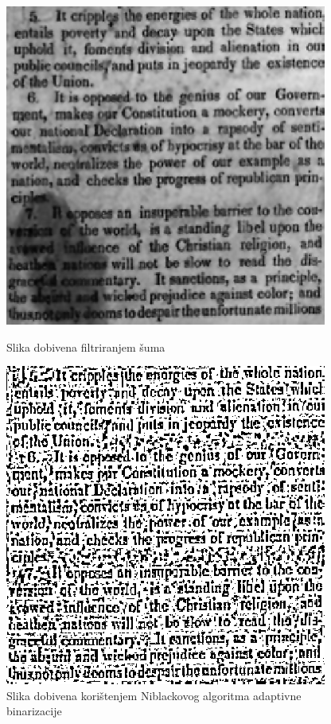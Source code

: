 \documentclass[times, utf8, zavrsni, numeric]{fer}
\begin{document}
\begin{figure}[!ht]
\centering
\begin{minipage}{.5\textwidth}
    \centering
    \includegraphics[width=.85\linewidth]{Images/Wiener.png}
    \caption{Slika dobivena filtriranjem šuma}
    \label{fig:wiener}
\end{minipage}%
\begin{minipage}{.5\textwidth}
    \centering
    \includegraphics[width=.85\linewidth]{Images/Niblack.png}
    \captionsetup{justification=centering}
    \caption{Slika dobivena korištenjem Niblackovog algoritma adaptivne binarizacije}
    \label{fig:niblack}
\end{minipage}
\end{figure}
\end{document}
